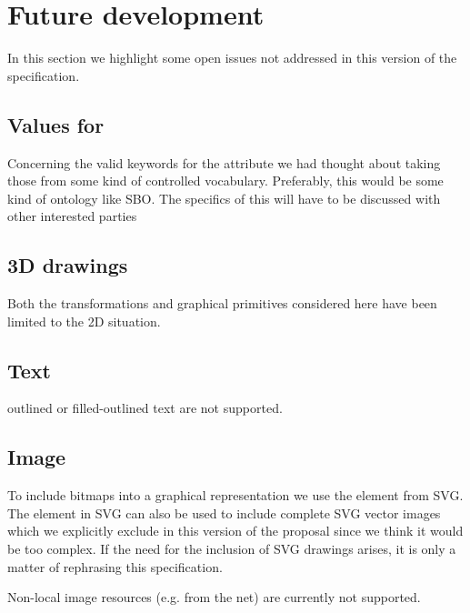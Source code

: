 
\section{Future development}
\label{future}

In this section we highlight some open issues not addressed in this version
of the \Render specification.



\subsection{Values for }


Concerning the valid 
keywords for the  attribute we had thought about taking those 
from some kind of controlled vocabulary. Preferably, this would be some kind of 
ontology like SBO. The specifics of this will have to be discussed with other 
interested parties

\subsection{3D drawings}

Both the transformations and graphical primitives considered here have been limited to the 2D situation. 

\subsection{Text}

outlined or filled-outlined text are not supported.

\subsection{Image}

To include bitmaps into a graphical representation we use the \Image element 
from SVG. The \Image element in SVG can also be used to include complete SVG 
vector images which we explicitly exclude in this version of the proposal 
since we think it would be too complex. If the need for the inclusion of SVG 
drawings arises, it is only a matter of rephrasing this specification.


Non-local image resources (e.g. from the net) are currently not supported.